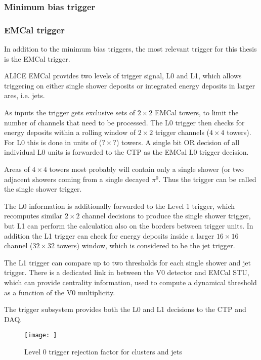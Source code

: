 \subsubsection*{Minimum bias trigger}



\subsubsection*{EMCal trigger}
In addition to the minimum bias triggers, the most relevant trigger for this thesis is the EMCal trigger. 

ALICE EMCal provides two levels of trigger signal, L0 and L1, which allows triggering on either single shower deposits or integrated energy deposits in larger ares, i.e. jets.

As inputs the trigger gets exclusive sets of $2\times2$ EMCal towers, to limit the number of channels that need to be processed. The L0 trigger then checks for energy deposits within a rolling window of $2\times2$ trigger channels ($4\times4$ towers). For L0 this is done in units of ($?\times?$) towers. A single bit OR decision of all individual L0 units is forwarded to the CTP as the EMCal L0 trigger decision.

Areas of $4\times4$ towers most probably will contain only a single shower (or two adjacent showers coming from a single decayed $\pi^0$. Thus the trigger can be called the single shower trigger.

The L0 information is additionally forwarded to the Level 1 trigger, which recomputes similar $2\times2$ channel decisions to produce the single shower trigger, but L1 can perform the calculation also on the borders between trigger units. In addition the L1 trigger can  check for energy deposits inside a larger $16\times16$ channel ($32\times32$ towers) window, which is considered to be the jet trigger.

The L1 trigger can compare up to two thresholds for each single shower and jet trigger. There is a dedicated link in between the V0 detector and EMCal STU, which can provide centrality information, used to compute a dynamical threshold as a function of the V0 multiplicity.

The trigger subsystem provides both the L0 and L1 decisions to the CTP and DAQ. 

\begin{figure}
\texttt{[image: ]}
\caption{Level 0 trigger rejection factor for clusters and jets}
\end{figure}
